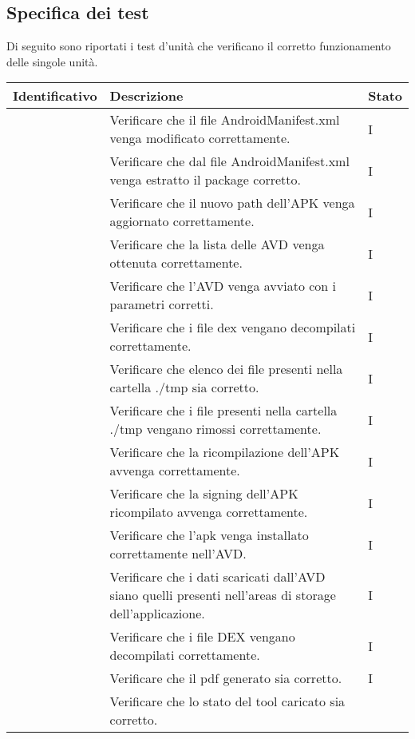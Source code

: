 \subsection{Specifica dei test}\label{subsec:specifica-dei-test-unitari}
Di seguito sono riportati i test d'unità che verificano il corretto funzionamento delle singole unità.
\begin{longtable}{ |C{3cm} | C{8.5cm}| C{1.5cm} |}
    \hline
    \textbf{Identificativo} &
    \textbf{Descrizione} &
    \textbf{Stato} \\\hline
     & Verificare che il file AndroidManifest.xml venga modificato correttamente.
    & I \\\hline
     & Verificare che dal file AndroidManifest.xml venga estratto il package corretto.
    & I \\\hline
     & Verificare che il nuovo path dell'APK venga aggiornato correttamente.
    & I \\\hline
     & Verificare che la lista delle AVD venga ottenuta correttamente.
    & I \\\hline
     & Verificare che l'AVD venga avviato con i parametri corretti.
    & I \\\hline
     & Verificare che i file dex vengano decompilati correttamente.
    & I \\\hline
     & Verificare che elenco dei file presenti nella cartella ./tmp sia corretto.
    & I \\\hline
     & Verificare che i file presenti nella cartella ./tmp vengano rimossi correttamente.
    & I \\\hline
     & Verificare che la ricompilazione dell'APK avvenga correttamente.
    & I \\\hline
     & Verificare che la signing dell'APK ricompilato avvenga correttamente.
    & I \\\hline
     & Verificare che l'apk venga installato correttamente nell'AVD.
    & I \\\hline
     & Verificare che i dati scaricati dall'AVD siano quelli presenti nell'areas di storage dell'applicazione.
    & I \\\hline
     & Verificare che i file DEX vengano decompilati correttamente.
    & I \\\hline
     & Verificare che il pdf generato sia corretto.
    & I \\\hline
     & Verificare che lo stato del tool caricato sia corretto.

\end{longtable}
